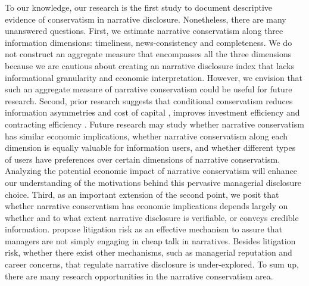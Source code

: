 \documentclass[letterpaper,12pt]{article}
\begin{document}
\begin{spacing}{1.5}
To our knowledge, our research is the first study to document descriptive evidence of conservatism in narrative disclosure. Nonetheless, there are many unanswered questions. First, we estimate narrative conservatism along three information dimensions: timeliness, news-consistency and completeness. We do not construct an aggregate measure that encompasses all the three dimensions because we are cautious about creating an narrative disclosure index that lacks informational granularity and economic interpretation. However, we envision that such an aggregate measure of narrative conservatism could be useful for future research. Second, prior research suggests that conditional conservatism reduces information asymmetries \cite{lafondInformationRoleConservatism2008, garcialaraInformationConsequencesAccounting2014} and cost of capital \cite{suijsValueRelevanceAsymmetric2008, garcialaraConditionalConservatismCost2011, guayConservativeDisclosure2018}, improves investment efficiency \cite{francisAcquisitionProfitabilityTimely2010, bushmanCapitalAllocationTimely2011, garcialaraAccountingConservatismFirm2016} and contracting efficiency \cite{wattsPositiveAccountingTheory1986, wattsConservatismAccountingPart2003, kothariImplicationsGAAPAnalysis2010}. Future research may study whether narrative conservatism has similar economic implications, whether narrative conservatism along each dimension is equally valuable for information users, and whether different types of users have preferences over certain dimensions of narrative conservatism. Analyzing the potential economic impact of narrative conservatism will enhance our understanding of the motivations behind this pervasive managerial disclosure choice. Third, as an important extension of the second point, we posit that whether narrative conservatism has economic implications depends largely on whether and to what extent narrative disclosure is verifiable, or conveys credible information.  propose litigation risk as an effective mechanism to assure that managers are not simply engaging in cheap talk in narratives. Besides litigation risk, whether there exist other mechanisms, such as managerial reputation and career concerns, that regulate narrative disclosure is under-explored. To sum up, there are many research opportunities in the narrative conservatism area.

\end{spacing}

\newpage



\newpage


\newpage


\newpage


\newpage
\setcounter{page}{1}

\end{document}
